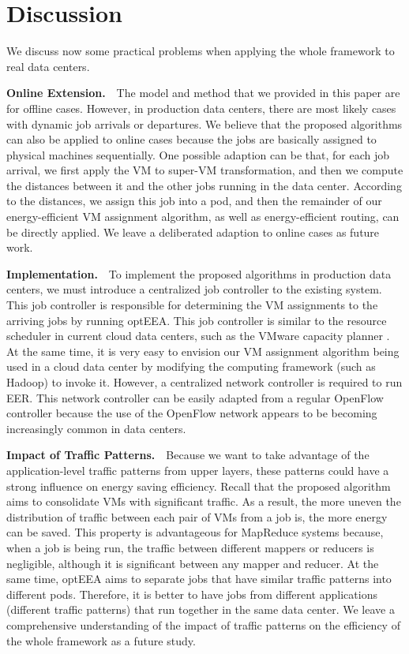\documentclass[journal,single-space,two column,twoside,10pt]{IEEEtran}
\begin{document}
\section{Discussion}
\label{sec:discussion}

We discuss now some practical problems when applying the whole framework to real data centers.

\textbf{Online Extension.}~~The model and method that we provided in this paper are for offline cases. However, in production data centers, there are most likely cases with dynamic job arrivals or departures. We believe that the proposed algorithms can also be applied to online cases because the jobs are basically assigned to physical machines sequentially. One possible adaption can be that, for each job arrival, we first apply the VM to super-VM transformation, and then we compute the distances between it and the other jobs running in the data center. According to the distances, we assign this job into a pod, and then the remainder of our energy-efficient VM assignment algorithm, as well as energy-efficient routing, can be directly applied. We leave a deliberated adaption to online cases as future work.

\textbf{Implementation.}~~To implement the proposed algorithms in production data centers, we must introduce a centralized job controller to the existing system. This job controller is responsible for determining the VM assignments to the arriving jobs by running optEEA. This job controller is similar to the resource scheduler in current cloud data centers, such as the VMware capacity planner \cite{VCP}. At the same time, it is very easy to envision our VM assignment algorithm being used in a cloud data center by modifying the computing framework (such as Hadoop) to invoke it. However, a centralized network controller is required to run EER. This network controller can be easily adapted from a regular OpenFlow controller because the use of the OpenFlow network appears to be becoming increasingly common in data centers.

\textbf{Impact of Traffic Patterns.}~~Because we want to take advantage of the application-level traffic patterns from upper layers, these patterns could have a strong influence on energy saving efficiency. Recall that the proposed algorithm aims to consolidate VMs with significant traffic. As a result, the more uneven the distribution of traffic between each pair of VMs from a job is, the more energy can be saved. This property is advantageous for MapReduce systems because, when a job is being run, the traffic between different mappers or reducers is negligible, although it is significant between any mapper and reducer. At the same time, optEEA aims to separate jobs that have similar traffic patterns into different pods. Therefore, it is better to have jobs from different applications (different traffic patterns) that run together in the same data center. We leave a comprehensive understanding of the impact of traffic patterns on the efficiency of the whole framework as a future study.
\end{document}
